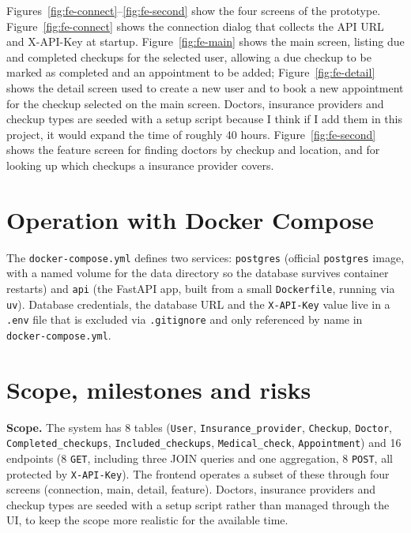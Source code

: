 \documentclass[11pt,a4paper]{article}
\begin{document}
Figures~\ref{fig:fe-connect}--\ref{fig:fe-second} show the four screens of the
prototype. Figure~\ref{fig:fe-connect} shows the connection dialog that
collects the API URL and X-API-Key at startup. Figure~\ref{fig:fe-main} shows
the main screen, listing due and completed checkups for the selected user, 
allowing a due checkup to be marked as completed and an appointment to be
added; Figure~\ref{fig:fe-detail} shows the detail screen used to create a new
user and to book a new appointment for the checkup selected on the
main screen. Doctors, insurance providers and checkup types are seeded with
a setup script because I think if I add them in this project, it would expand the time of roughly 40 hours.
Figure~\ref{fig:fe-second} shows the feature screen for finding doctors by
checkup and location, and for looking up which checkups a insurance
provider covers.

\newpage
\section{Operation with Docker Compose}

The \texttt{docker-compose.yml} defines two services: \texttt{postgres}
(official \texttt{postgres} image, with a named volume for the data directory
so the database survives container restarts) and \texttt{api} (the FastAPI
app, built from a small \texttt{Dockerfile}, running via \texttt{uv}). 
Database credentials, the database URL and the \texttt{X-API-Key}
value live in a \texttt{.env} file that is excluded via \texttt{.gitignore}
and only referenced by name in \texttt{docker-compose.yml}. 

\section{Scope, milestones and risks}

\textbf{Scope.} The system has 8 tables (\texttt{User}, \texttt{Insurance\_provider},
\texttt{Checkup}, \texttt{Doctor}, \texttt{Completed\_checkups},
\texttt{Included\_checkups}, \texttt{Medical\_check}, \texttt{Appointment})
and 16 endpoints (8 \texttt{GET}, including three JOIN queries and one
aggregation, 8 \texttt{POST}, all protected by \texttt{X-API-Key}). The
frontend operates a subset of these through four screens (connection, main,
detail, feature). Doctors, insurance providers and checkup types are
seeded with a setup script rather than managed through the UI, to keep the
scope more realistic for the available time.
\end{document}
